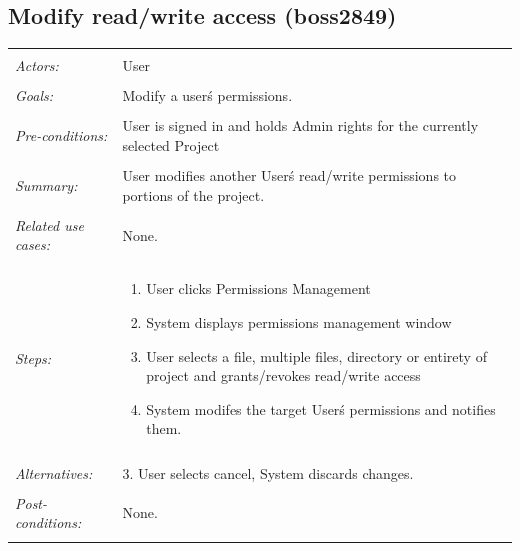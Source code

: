 \documentclass[11pt]{report}
\begin{document}
\subsection{Modify read/write access (boss2849)}
\begin{tabular}{ p{2cm} p{12cm} }
 \hline
 \\
 \textit{Actors:} & User \\ 
 \\
 \textit{Goals:} & Modify a user\'s permissions. \\
 \\
 \textit{Pre-conditions:} & User is signed in and holds Admin rights for the currently selected Project\\
 \\
 \textit{Summary:} & User modifies another User\'s read/write permissions to portions of the project. \\
 \\
 \textit{Related use cases:} & None. \\ 
 \\
 \textit{Steps:} & \begin{enumerate}
  \item User clicks Permissions Management
  \item System displays permissions management window
  \item User selects a file, multiple files, directory or entirety of project and grants/revokes read/write access
  \item System modifes the target User\'s permissions and notifies them.
 \end{enumerate} \\
 \\
 \textit{Alternatives:} & 3. User selects cancel, System discards changes. \\
 \\
 \textit{Post-conditions:} & None. \\
 \\
\hline
\end{tabular}
\end{document}
